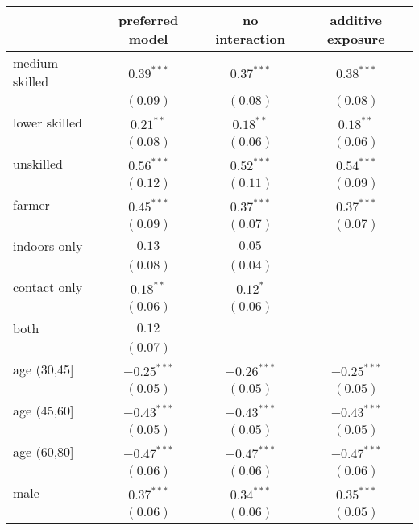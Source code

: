 
\begin{table}
\begin{center}
\begin{tabular}{l c c c}
\hline
 & preferred model & no interaction & additive exposure \\
\hline
medium skilled & $0.39^{***}$  & $0.37^{***}$  & $0.38^{***}$  \\
               & $(0.09)$      & $(0.08)$      & $(0.08)$      \\
lower skilled  & $0.21^{**}$   & $0.18^{**}$   & $0.18^{**}$   \\
               & $(0.08)$      & $(0.06)$      & $(0.06)$      \\
unskilled      & $0.56^{***}$  & $0.52^{***}$  & $0.54^{***}$  \\
               & $(0.12)$      & $(0.11)$      & $(0.09)$      \\
farmer         & $0.45^{***}$  & $0.37^{***}$  & $0.37^{***}$  \\
               & $(0.09)$      & $(0.07)$      & $(0.07)$      \\
indoors only   & $0.13$        & $0.05$        &               \\
               & $(0.08)$      & $(0.04)$      &               \\
contact only   & $0.18^{**}$   & $0.12^{*}$    &               \\
               & $(0.06)$      & $(0.06)$      &               \\
both           & $0.12$        &               &               \\
               & $(0.07)$      &               &               \\
age (30,45]    & $-0.25^{***}$ & $-0.26^{***}$ & $-0.25^{***}$ \\
               & $(0.05)$      & $(0.05)$      & $(0.05)$      \\
age (45,60]    & $-0.43^{***}$ & $-0.43^{***}$ & $-0.43^{***}$ \\
               & $(0.05)$      & $(0.05)$      & $(0.05)$      \\
age (60,80]    & $-0.47^{***}$ & $-0.47^{***}$ & $-0.47^{***}$ \\
               & $(0.06)$      & $(0.06)$      & $(0.06)$      \\
male           & $0.37^{***}$  & $0.34^{***}$  & $0.35^{***}$  \\
               & $(0.06)$      & $(0.06)$      & $(0.05)$      \\

\end{tabular}
\end{center}
\end{table}
